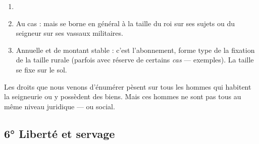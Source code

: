 \documentclass[french,twoside]{book} %
\begin{document}
\begin{enumerate}[itemsep=0pt,]
\item[] \hspace{-1.5em}{\bfseries Deux formes :}
\item Au cas : mais se borne en général à la taille du roi sur ses sujets ou du seigneur sur ses vassaux militaires.
\item Annuelle et de montant stable : c’est l’abonnement, forme type de la fixation de la taille rurale (parfois avec réserve de certains \emph{cas} — exemples). La taille se fixe sur le sol.

\end{enumerate}\noindent Les droits que nous venons d’énumérer pèsent sur tous les hommes qui habitent la seigneurie ou y possèdent des biens. Mais ces hommes ne sont pas tous au même niveau juridique — ou social.  
\label{p59}
\subsection[6° Liberté et servage]{6° Liberté et servage}
\end{document}
